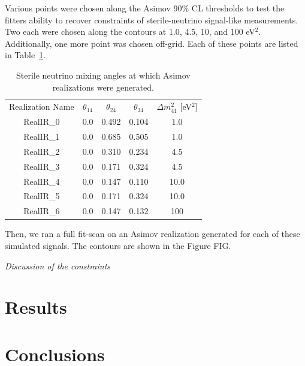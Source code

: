 \documentclass[main.tex]{subfiles}
\begin{document}
Various points were chosen along the Asimov 90\% CL thresholds to test the fitters ability to recover constraints of sterile-neutrino signal-like measurements. 
Two each were chosen along the contours at 1.0, 4.5, 10, and 100 eV$^{2}$. 
Additionally, one more point was chosen off-grid. 
Each of these points are listed in Table~\ref{table:injected_signals}.

\begin{table}
    \centering
    \begin{tabular}{c | cccc}\rowcolor{blue!25}
            Realization Name & $\theta_{14}$ & $\theta_{24}$ & $\theta_{34}$ & $\Delta m_{41}^{2}$ [eV$^{2}$] \\
            RealIR\_0 & 0.0 & 0.492 & 0.104 & 1.0 \\
            RealIR\_1 & 0.0 & 0.685 & 0.505 & 1.0 \\
            RealIR\_2 & 0.0 & 0.310 & 0.234 & 4.5 \\
            RealIR\_3 & 0.0 & 0.171 & 0.324 & 4.5 \\
            RealIR\_4 & 0.0 & 0.147 & 0.110 & 10.0 \\
            RealIR\_5 & 0.0 & 0.171 & 0.324 & 10.0 \\
            RealIR\_6 & 0.0 & 0.147 & 0.132 & 100 
    \end{tabular}
    \caption{Sterile neutrino mixing angles at which Asimov realizations were generated.}\label{table:injected_signals}
\end{table}

Then, we ran a full fit-scan on an Asimov realization generated for each of these simulated signals. 
The contours are shown in the Figure FIG. 

\textit{Discussion of the constraints}


\section{Results}

\section{Conclusions}
\end{document}
